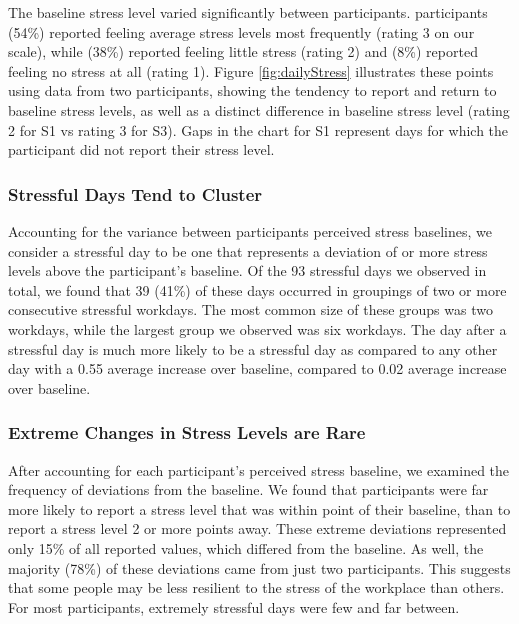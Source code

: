 The baseline stress level varied significantly between participants. 
participants (54\%) reported feeling average stress levels most frequently
(rating 3 on our scale), while  (38\%) reported feeling little stress
(rating 2) and  (8\%) reported feeling no stress at all (rating 1). Figure \ref{fig:dailyStress} illustrates these points using  data from two participants, showing the tendency to report and return to baseline stress levels, as well
as a distinct difference in baseline stress level (rating 2 for S1 vs rating 3 for S3). Gaps in the chart for S1 represent days for which the participant did not report their stress level.


\subsubsection{Stressful Days Tend to Cluster}
Accounting for the variance between participants perceived stress
baselines, we consider a stressful day to be one that represents a
deviation of  or more stress levels above the participant's
baseline. Of the 93 stressful days we observed in total, we found that
39 (41\%) of these days occurred in groupings of two or more
consecutive stressful workdays. The most common size of these groups
was two workdays, while the largest group we observed was six
workdays.  The day after a stressful day is much more likely to be a
stressful day as compared to any other day with a 0.55 average increase
over baseline, compared to 0.02 average increase over baseline.

\subsubsection{Extreme Changes in Stress Levels are Rare}
After accounting for each participant's perceived stress baseline, we
examined the frequency of deviations from the baseline. We found that
participants were far more likely to report a stress level that was
within  point of their baseline, than to report a stress level 2 or
more points away. These extreme deviations represented only 15\% of
all reported values, which differed from the  baseline. As
well, the majority (78\%) of these deviations came from just two
participants. This suggests that some people may be less resilient to
the stress of the workplace than others. For most participants,
extremely stressful days were few and far between.

